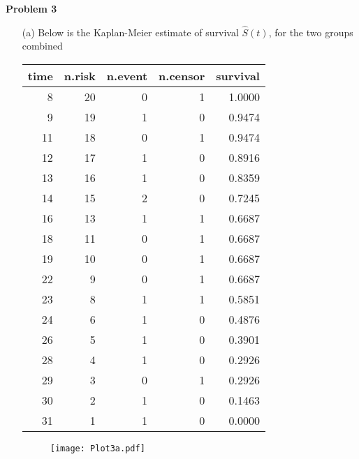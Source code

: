 \documentclass[11pt,a4paper]{article}
\begin{document}
\noindent
\textbf{Problem 3} 
\begin{itemize}
\item[(a)]
Below is the Kaplan-Meier estimate of survival $\hat{S}(t)$, for the two groups combined
\begin{table}[ht]
\centering
\begin{tabular}{rrrrr}
  \hline
time & n.risk & n.event & n.censor & survival \\ 
  \hline
8 & 20 & 0 & 1 & 1.0000 \\ 
  9 & 19 & 1 & 0 & 0.9474 \\ 
  11 & 18 & 0 & 1 & 0.9474 \\ 
  12 & 17 & 1 & 0 & 0.8916 \\ 
  13 & 16 & 1 & 0 & 0.8359 \\ 
  14 & 15 & 2 & 0 & 0.7245 \\ 
  16 & 13 & 1 & 1 & 0.6687 \\ 
  18 & 11 & 0 & 1 & 0.6687 \\ 
  19 & 10 & 0 & 1 & 0.6687 \\ 
  22 & 9 & 0 & 1 & 0.6687 \\ 
  23 & 8 & 1 & 1 & 0.5851 \\ 
  24 & 6 & 1 & 0 & 0.4876 \\ 
  26 & 5 & 1 & 0 & 0.3901 \\ 
  28 & 4 & 1 & 0 & 0.2926 \\ 
  29 & 3 & 0 & 1 & 0.2926 \\ 
  30 & 2 & 1 & 0 & 0.1463 \\ 
  31 & 1 & 1 & 0 & 0.0000 \\ 
   \hline
\end{tabular}
\end{table}
\begin{figure}[H]
\begin{center}
\texttt{[image: Plot3a.pdf]}
\end{center}
\end{figure}


\end{itemize}
\end{document}
